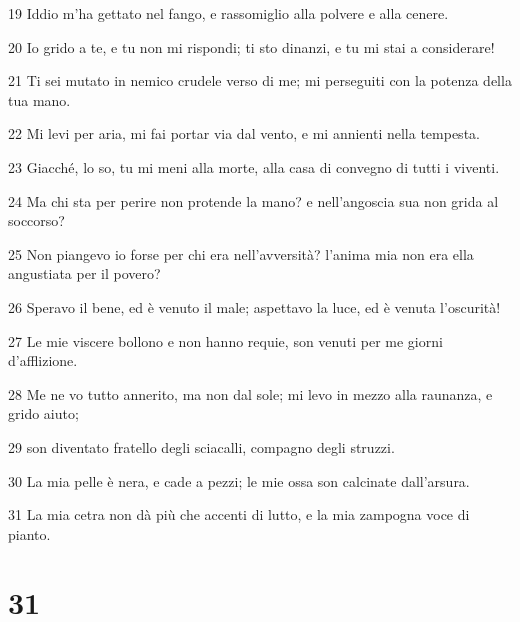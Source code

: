 \par 19 Iddio m'ha gettato nel fango, e rassomiglio alla polvere e alla cenere.
\par 20 Io grido a te, e tu non mi rispondi; ti sto dinanzi, e tu mi stai a considerare!
\par 21 Ti sei mutato in nemico crudele verso di me; mi perseguiti con la potenza della tua mano.
\par 22 Mi levi per aria, mi fai portar via dal vento, e mi annienti nella tempesta.
\par 23 Giacché, lo so, tu mi meni alla morte, alla casa di convegno di tutti i viventi.
\par 24 Ma chi sta per perire non protende la mano? e nell'angoscia sua non grida al soccorso?
\par 25 Non piangevo io forse per chi era nell'avversità? l'anima mia non era ella angustiata per il povero?
\par 26 Speravo il bene, ed è venuto il male; aspettavo la luce, ed è venuta l'oscurità!
\par 27 Le mie viscere bollono e non hanno requie, son venuti per me giorni d'afflizione.
\par 28 Me ne vo tutto annerito, ma non dal sole; mi levo in mezzo alla raunanza, e grido aiuto;
\par 29 son diventato fratello degli sciacalli, compagno degli struzzi.
\par 30 La mia pelle è nera, e cade a pezzi; le mie ossa son calcinate dall'arsura.
\par 31 La mia cetra non dà più che accenti di lutto, e la mia zampogna voce di pianto.

\chapter{31}

